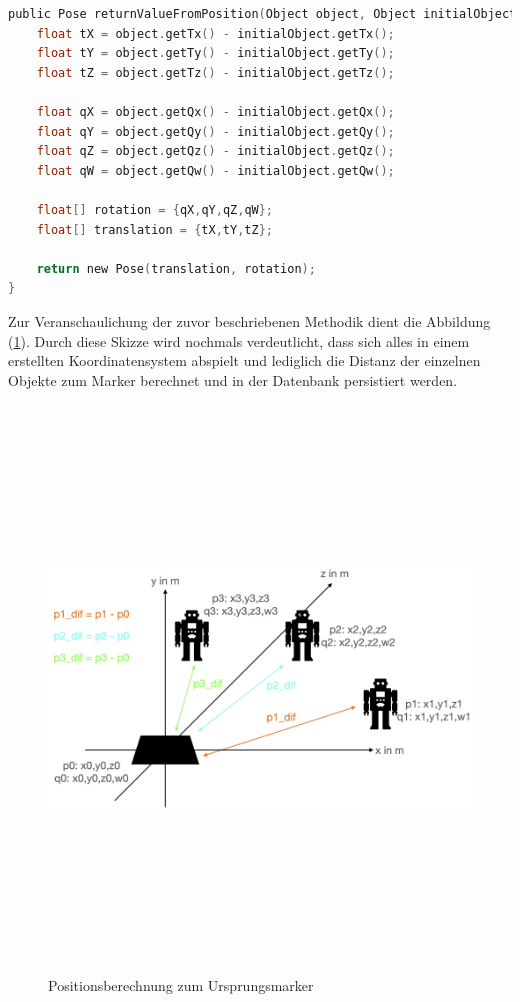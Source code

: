 \begin{lstlisting}[language=C,
    frame=lines,           % Ein Rahmen um den Code (single for box, lines for top and bottom)
    xleftmargin=\parindent,  % Rahmen link von den Zahlen
    style=algoBericht,
    label={code:differencetoinitial},
    captionpos=b,           % Caption unter den Code setzen
caption={Berechnung der Distanz zwischen Marker und Ursprungspunkt}]
public Pose returnValueFromPosition(Object object, Object initialObject){
    float tX = object.getTx() - initialObject.getTx();
    float tY = object.getTy() - initialObject.getTy();
    float tZ = object.getTz() - initialObject.getTz();

    float qX = object.getQx() - initialObject.getQx();
    float qY = object.getQy() - initialObject.getQy();
    float qZ = object.getQz() - initialObject.getQz();
    float qW = object.getQw() - initialObject.getQw();

    float[] rotation = {qX,qY,qZ,qW};
    float[] translation = {tX,tY,tZ};

    return new Pose(translation, rotation);
}
\end{lstlisting}
Zur Veranschaulichung der zuvor beschriebenen Methodik dient die Abbildung (\ref{pic:differenztoinitial}). Durch diese Skizze wird nochmals verdeutlicht, dass 
sich alles in einem erstellten Koordinatensystem abspielt und lediglich die Distanz der einzelnen Objekte zum Marker berechnet und in der Datenbank persistiert 
werden.
\begin{figure}[hbt!]
    \centering
    \includegraphics[width=15cm,height=15cm,keepaspectratio]{4Umsetzung/Bilder/difcalc.jpeg}
    \caption{Positionsberechnung zum Ursprungsmarker}
    \label{pic:differenztoinitial}
\end{figure}
